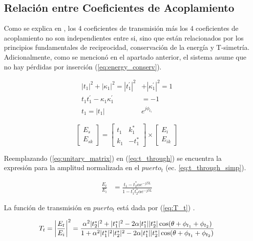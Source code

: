 \subsection{Relación entre Coeficientes de Acoplamiento}
\label{ss:params_relation}

Como se explica en \cite{yariv2006photonics}, los 4 coeficientes de transmisión más
los 4 coeficientes de acoplamiento no son independientes entre si, sino que están
relacionados por los principios fundamentales de reciprocidad, conservación de la energía
y T-simetría. Adicionalmente, como se mencionó en el apartado anterior, el sistema
asume que no hay pérdidas por inserción (\ref{eq:energy_conserv}).

\begin{align}
|t_1|^2 + |\kappa_1|^2 = |t_1^{'}|^2 &+ |\kappa_1^{'}|^2 = 1  \label{eq:energy_conserv} \\
t_1 t_1^{'} - \kappa_1 \kappa_1^{'} &= -1 \label{eq:unitary_matrix} \\
t_1 = |t_1|& e^{j \phi_{t_1}}
\end{align} 

\begin{equation}
    \left[ \begin{array}{c} E_s \\ E_{sk} \end{array} \right] 
    = 
    \begin{bmatrix} t_1 & k_1^* \\ k_1 & -t_1^* \end{bmatrix} 
    \times 
    \left[ \begin{array}{c} E_i \\ E_{ik} \end{array} \right]
\label{eq:eqname}
\end{equation} 

Reemplazando (\ref{eq:unitary_matrix}) en (\ref{eq:t_through}) se encuentra la
expresión para la amplitud normalizada en el $puerto_t$ (ec. \ref{eq:t_through_simp}).

\begin{align}
\frac{E_t}{E_i} &= 
    \frac{t_1 - t_2^* \alpha e^{-j \beta L}}
    {1 - t_1^* t_2^* \alpha e^{-j \beta L}} \label{eq:t_through_simp}
\end{align} 

La función de transmisión en $puerto_t$ está dada por (\ref{eq:T_t}) \cite{paloczi2005polymer}.

\begin{align}
 T_t &= \abs*{\frac{E_t}{E_i}}^2 = 
    \frac{\alpha^2 |t_2^*|^2 + |t_1^*|^2 - 2\alpha |t_1^*||t_2^*| 
	\cos(\theta + \phi_{t_1} + \phi_{t_2}) }
    {1 + \alpha^2|t_1^*|^2 |t_2^*|^2 - 2\alpha |t_1^*||t_2^*|
	\cos(\theta + \phi_{t_1} + \phi_{t_2}) }
\\ 
\label{eq:T_t}
\end{align} 
